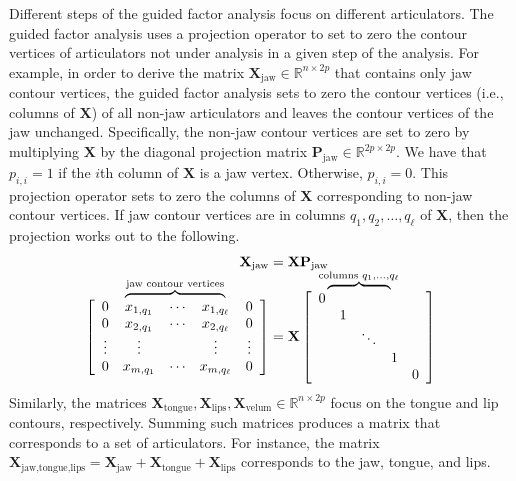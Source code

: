 \documentclass[reprint]{JASAnew}\usepackage[]{graphicx}\usepackage[]{color}
\newcommand\bovermat[2]{%
  \makebox[0pt][l]{$\smash{\overbrace{\phantom{%
    \begin{matrix}#2\end{matrix}}}^{#1}}$}#2}
\begin{document}
Different steps of the guided factor analysis focus on different articulators.
%
The guided factor analysis uses a projection operator to set to zero the contour vertices of articulators not under analysis in a given step of the analysis.
% 
For example, in order to derive the matrix $\mathbf{X}_\text{jaw} \in \mathbb{R}^{n\times 2p}$ that contains only jaw contour vertices, the guided factor analysis sets to zero the contour vertices (i.e., columns of $\mathbf{X}$) of all non-jaw articulators and leaves the contour vertices of the jaw unchanged. 
%
Specifically, the non-jaw contour vertices are set to zero by multiplying $\mathbf{X}$  
% 
by the diagonal projection matrix $\mathbf{P}_\text{jaw} \in \mathbb{R}^{2p\times 2p}$. 
% 
We have that $p_{i,i}=1$ if the $i$th column of $\mathbf{X}$ is a jaw vertex. Otherwise, $p_{i,i}=0$. 
% 
This projection operator sets to zero the columns of $\mathbf{X}$ corresponding to non-jaw contour vertices. 
% 
If jaw contour vertices are in columns $q_1,q_2,\ldots,q_\ell$ of $\mathbf{X}$, then the projection works out to the following. 
% 
\begin{equation}
\begin{split}
  \mathbf{X}_\text{jaw} &= \mathbf{X} \mathbf{P}_\text{jaw} \\[10pt]
%
  \left[ {\begin{array}{ccccc}
   0 & \bovermat{\text{jaw contour vertices}}{x_{1,q_1} &  \cdots & x_{1,q_\ell}} & 0 \\
   0 & x_{2,q_1} &  \cdots & x_{2,q_\ell} & 0 \\
   \vdots & \vdots & & \vdots & \vdots \\
   0 & x_{m,q_1} & \cdots & x_{m,q_\ell} & 0 \\
  \end{array} } \right]
%
  &= 
%
   \mathbf{X}
%
   \left[ {\begin{array}{ccccc}
   \bovermat{\text{columns } q_1,\ldots,q_\ell}{0&&&&}\\
   & 1 &&&\\
   && \ddots &&\\
   &&& 1 &\\
   &&&& 0 \\
  \end{array} } \right]
\end{split}
\end{equation}
%
Similarly, the matrices $\mathbf{X}_\text{tongue},\mathbf{X}_\text{lips},\mathbf{X}_\text{velum} \in \mathbb{R}^{n\times 2p}$ focus on the tongue and lip contours, respectively. 
% 
Summing such matrices produces a matrix that corresponds to a set of articulators. For instance, the matrix $\mathbf{X}_{\text{jaw,tongue,lips}} = \mathbf{X}_\text{jaw} + \mathbf{X}_\text{tongue} + \mathbf{X}_\text{lips}$ corresponds to the jaw, tongue, and lips.
\end{document}
